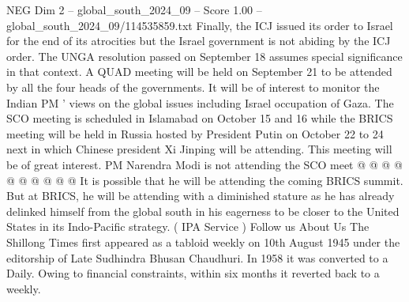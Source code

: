 \begin{textsample}{NEG Dim 2 – global\_south\_2024\_09 – Score 1.00 – global\_south\_2024\_09/114535859.txt}
Finally, the ICJ issued its order to Israel for the end of its atrocities but the Israel government is not abiding by the ICJ order.
The UNGA resolution passed on September 18 assumes special significance in that context.
A QUAD meeting will be held on September 21 to be attended by all the four heads of the governments.
It will be of interest to monitor the Indian PM ' views on the global issues including Israel occupation of Gaza.
The SCO meeting is scheduled in Islamabad on October 15 and 16 while the BRICS meeting will be held in Russia hosted by President Putin on October 22 to 24 next in which Chinese president Xi Jinping will be attending.
This meeting will be of great interest.
PM Narendra Modi is not attending the SCO meet @ @ @ @ @ @ @ @ @ @ It is possible that he will be attending the coming BRICS summit.
But at BRICS, he will be attending with a diminished stature as he has already delinked himself from the global south in his eagerness to be closer to the United States in its Indo-Pacific strategy. ( IPA Service ) Follow us About Us The Shillong Times first appeared as a tabloid weekly on 10th August 1945 under the editorship of Late Sudhindra Bhusan Chaudhuri.
In 1958 it was converted to a Daily.
Owing to financial constraints, within six months it reverted back to a weekly.

\end{textsample}
